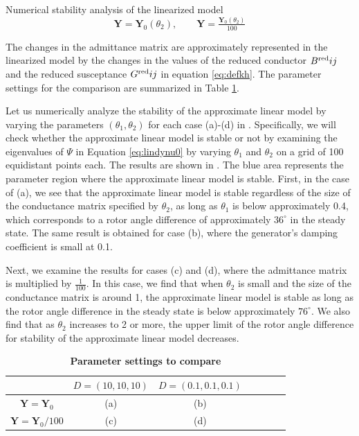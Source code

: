 \documentclass[graybox, envcountchap]{svmult}
\begin{document}
\begin{example}{Numerical stability analysis of the linearized model}
\begin{equation*}
  \bm{Y} = \bm{Y}_0(\theta_2)
  ,\qquad
  \bm{Y} = \tfrac{\bm{Y}_0(\theta_2)}{100}
\end{equation*}

The changes in the admittance matrix are approximately represented in the
linearized model by the changes in the values of the reduced conductor $B^{\rm
red}{ij}$ and the reduced susceptance $G^{\rm red}{ij}$ in equation
\ref{eq:defkh}. The parameter settings for the comparison are summarized in
Table \ref{table:parasetcom}.

Let us numerically analyze the stability of the approximate linear model by
varying the parameters $(\theta_1, \theta_2)$ for each case (a)-(d) in
. Specifically, we will check whether the approximate
linear model is stable or not by examining the eigenvalues of $\Psi$ in Equation
\ref{eq:lindynu0} by varying $\theta_1$ and $\theta_2$ on a grid of 100
equidistant points each. The results are shown in . The
blue area represents the parameter region where the approximate linear model is
stable. First, in the case of (a), we see that the approximate linear model is
stable regardless of the size of the conductance matrix specified by $\theta_2$,
as long as $\theta_1$ is below approximately 0.4, which corresponds to a rotor
angle difference of approximately $36^\circ$ in the steady state. The same
result is obtained for case (b), where the generator's damping coefficient is
small at 0.1.

Next, we examine the results for cases (c) and (d), where the admittance matrix
is multiplied by $\tfrac{1}{100}$. In this case, we find that when $\theta_2$
is small and the size of the conductance matrix is around 1, the approximate
linear model is stable as long as the rotor angle difference in the steady state
is below approximately $76^\circ$. We also find that as $\theta_2$ increases to
2 or more, the upper limit of the rotor angle difference for stability of the
approximate linear model decreases.
\end{example}

\begin{table}[h]
\medskip
 \caption{\textbf{Parameter settings to compare}}
 \label{table:parasetcom}
 \centering
  \begin{tabular}{|c|c|c|c|c|c|c|}
   \hline
 &    $D=(10,10,10)$ &   $D=(0.1,0.1,0.1)$ \\
   \hline 
 $\bm{Y} =\bm{Y}_0$ & (a) & (b) \\
   \hline
 $\bm{Y} = \bm{Y}_0/100  $  & (c) & (d) \\
   \hline
  \end{tabular}
\end{table}
\end{document}
